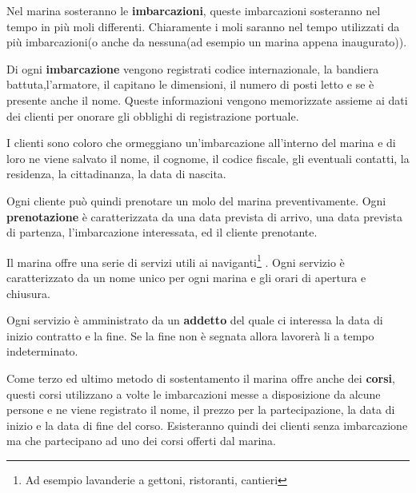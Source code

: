

Nel marina sosteranno le \textbf{imbarcazioni}, queste imbarcazioni sosteranno nel tempo in più moli differenti. Chiaramente i moli saranno nel tempo utilizzati da più imbarcazioni(o anche da nessuna(ad esempio un marina appena inaugurato)).

Di ogni \textbf{imbarcazione} vengono registrati codice internazionale, la bandiera battuta,l'armatore, il capitano le dimensioni, il numero di posti letto e se è presente anche il nome. Queste informazioni vengono memorizzate assieme ai dati dei clienti per onorare gli obblighi di registrazione portuale.

I clienti sono coloro che ormeggiano un'imbarcazione all'interno del marina e di loro ne viene salvato il nome, il cognome, il codice fiscale, gli eventuali contatti, la residenza, la cittadinanza, la data di nascita.

Ogni cliente può quindi prenotare un molo del marina preventivamente. Ogni \textbf{prenotazione} è caratterizzata da una data prevista di arrivo, una data prevista di partenza, l'imbarcazione interessata, ed il cliente prenotante.


Il marina offre una serie di servizi utili ai naviganti\footnote{Ad esempio lavanderie a gettoni, ristoranti, cantieri} . Ogni servizio è caratterizzato da un nome unico per ogni marina e gli orari di apertura e chiusura.

Ogni servizio è amministrato da un \textbf{addetto} del quale ci interessa la data di inizio contratto e la fine. Se la fine non è segnata allora lavorerà li a tempo indeterminato.

Come terzo ed ultimo metodo di sostentamento il marina offre anche dei \textbf{corsi}, questi corsi utilizzano a volte le imbarcazioni messe a disposizione da alcune persone e ne viene registrato il nome, il prezzo per la partecipazione, la data di inizio e la data di fine del corso. Esisteranno quindi dei clienti senza imbarcazione ma che partecipano ad uno dei corsi offerti dal marina.
 
